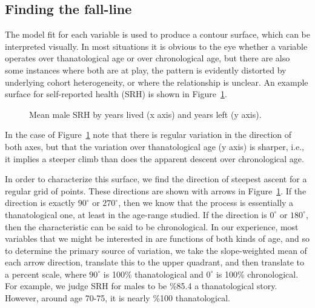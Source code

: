 \documentclass{article}
\begin{document}
\subsection{Finding the fall-line}
The model fit for each variable is used to produce a contour surface, which can
be interpreted visually. In most situations it is obvious to the eye whether a
variable operates over thanatological age or over chronological age, but there
are also some instances where both are at play, the pattern is evidently
distorted by underlying cohort heterogeneity, or where the relationship is
unclear. An example surface for self-reported health (SRH) is shown in
Figure~\ref{fig:srh}.

\begin{figure}[!h]
    \centering
    \caption{Mean male SRH by years lived (x axis) and years left (y axis).}
    \label{fig:srh}
	\vspace{-2em}
\end{figure}

In the case of Figure~\ref{fig:srh} note that there is regular variation in the
direction of both axes, but that the variation over thanatological age (y axis)
is sharper, i.e., it implies a steeper climb than does the apparent descent over
chronological age. 

In order to characterize this surface, we find the direction
of steepest ascent for a regular grid of points. These directions are shown with
arrows in Figure~\ref{fig:srh}. If the direction is exactly $90^\circ$ or $270^\circ$,
then we know that the process is essentially a thanatological one, at least in
the age-range studied. If the direction is $0^\circ$ or $180^\circ$, then the
characteristic can be said to be chronological. In our experience, most
variables that we might be interested in are functions of both kinds of age, and
so to determine the primary source of variation, we take the slope-weighted mean
of each arrow direction, translate this to the upper quadrant, and then
translate to a percent scale, where $90^\circ$ is 100\% thanatological and
$0^\circ$ is 100\% chronological. For example, we judge SRH for males to be
\%85.4 a thanatological story. However, around age 70-75, it is nearly \%100 
thanatological.
\end{document}
